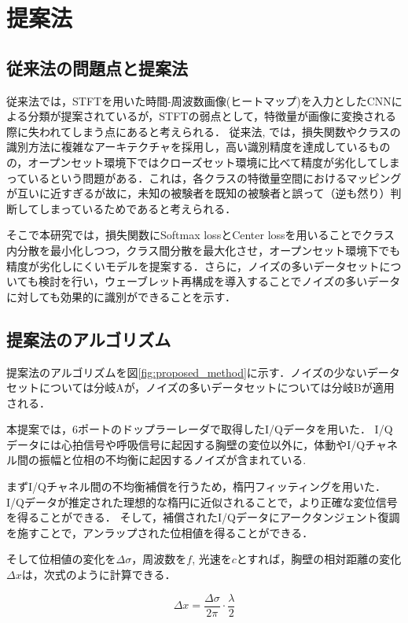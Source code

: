 \chapter{提案法}
\section{従来法の問題点と提案法}
従来法\cite{paper:HeartID}では，STFTを用いた時間-周波数画像(ヒートマップ)を入力としたCNNによる分類が提案されているが，STFTの弱点として，特徴量が画像に変換される際に失われてしまう点にあると考えられる．
従来法\cite{paper:HeartSignature}, \cite{paper:Xing}では，損失関数やクラスの識別方法に複雑なアーキテクチャを採用し，高い識別精度を達成しているものの，オープンセット環境下ではクローズセット環境に比べて精度が劣化してしまっているという問題がある．これは，各クラスの特徴量空間におけるマッピングが互いに近すぎるが故に，未知の被験者を既知の被験者と誤って（逆も然り）判断してしまっているためであると考えられる．

そこで本研究では，損失関数にSoftmax lossとCenter lossを用いることでクラス内分散を最小化しつつ，クラス間分散を最大化させ，オープンセット環境下でも精度が劣化しにくいモデルを提案する．さらに，ノイズの多いデータセットについても検討を行い，ウェーブレット再構成を導入することでノイズの多いデータに対しても効果的に識別ができることを示す．

\section{提案法のアルゴリズム}
提案法のアルゴリズムを図\ref{fig:proposed_method}に示す．ノイズの少ないデータセットについては分岐Aが，ノイズの多いデータセットについては分岐Bが適用される．

本提案では，6ポートのドップラーレーダで取得したI/Qデータを用いた．
I/Qデータには心拍信号や呼吸信号に起因する胸壁の変位以外に，体動やI/Qチャネル間の振幅と位相の不均衡に起因するノイズが含まれている.

まずI/Qチャネル間の不均衡補償を行うため，楕円フィッティングを用いた．I/Qデータが推定された理想的な楕円に近似されることで，より正確な変位信号を得ることができる\cite{paper:ellipse1}\cite{paper:ellipse2}．
そして，補償されたI/Qデータにアークタンジェント復調を施すことで，アンラップされた位相値を得ることができる．

そして位相値の変化を$\Delta \sigma$，周波数を$f$, 光速を$c$とすれば，胸壁の相対距離の変化$\Delta x$は，次式のように計算できる．

\begin{equation}
	\Delta x = \frac{\Delta \sigma}{2 \pi} \cdot \frac{\lambda}{2}
\end{equation}

